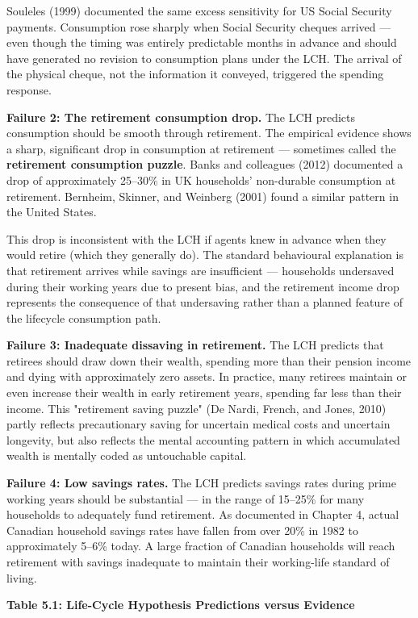 \documentclass[12pt, letterpaper]{article}
\begin{document}
Souleles (1999) documented the same excess sensitivity for US Social Security payments. Consumption rose sharply when Social Security cheques arrived --- even though the timing was entirely predictable months in advance and should have generated no revision to consumption plans under the LCH. The arrival of the physical cheque, not the information it conveyed, triggered the spending response.

\textbf{Failure 2: The retirement consumption drop.} The LCH predicts consumption should be smooth through retirement. The empirical evidence shows a sharp, significant drop in consumption at retirement --- sometimes called the \textbf{retirement consumption puzzle}. Banks and colleagues (2012) documented a drop of approximately 25--30\% in UK households' non-durable consumption at retirement. Bernheim, Skinner, and Weinberg (2001) found a similar pattern in the United States.

This drop is inconsistent with the LCH if agents knew in advance when they would retire (which they generally do). The standard behavioural explanation is that retirement arrives while savings are insufficient --- households undersaved during their working years due to present bias, and the retirement income drop represents the consequence of that undersaving rather than a planned feature of the lifecycle consumption path.

\textbf{Failure 3: Inadequate dissaving in retirement.} The LCH predicts that retirees should draw down their wealth, spending more than their pension income and dying with approximately zero assets. In practice, many retirees maintain or even increase their wealth in early retirement years, spending far less than their income. This "retirement saving puzzle" (De Nardi, French, and Jones, 2010) partly reflects precautionary saving for uncertain medical costs and uncertain longevity, but also reflects the mental accounting pattern in which accumulated wealth is mentally coded as untouchable capital.

\textbf{Failure 4: Low savings rates.} The LCH predicts savings rates during prime working years should be substantial --- in the range of 15--25\% for many households to adequately fund retirement. As documented in Chapter 4, actual Canadian household savings rates have fallen from over 20\% in 1982 to approximately 5--6\% today. A large fraction of Canadian households will reach retirement with savings inadequate to maintain their working-life standard of living.

\textbf{Table 5.1: Life-Cycle Hypothesis Predictions versus Evidence}
\end{document}
